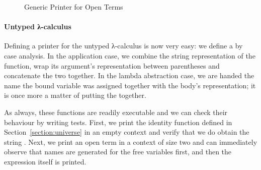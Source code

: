 \begin{figure}[h]
\caption{Generic Printer for Open Terms}\label{fig:genericprint}
\end{figure}


\paragraph{Untyped λ-calculus} Defining a printer for the untyped
λ-calculus is now very easy: we define a  by case analysis.
In the application case, we combine the string representation of the
function, wrap its argument's representation between parentheses and
concatenate the two together. In the lambda abstraction case, we are
handed the name the bound variable was assigned together with the body's
representation; it is once more a matter of putting the 
together.

\begin{agdasnippet}
\end{agdasnippet}

As always, these functions are readily executable and we can check
their behaviour by writing tests. First, we print the identity function
defined in Section~\ref{section:universe}
in an empty context and verify that we do obtain the string .
Next, we print an open term in a context of size two and can immediately
observe that names are generated for the free variables first, and then the
expression itself is printed.

\begin{minipage}[t]{0.45\textwidth}
  \begin{agdasnippet}
  \end{agdasnippet}
\end{minipage}
\begin{minipage}[t]{0.45\textwidth}
  \begin{agdasnippet}
  \end{agdasnippet}
\end{minipage}
